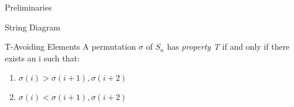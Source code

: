 \documentclass[11pt]{amsart}
\theoremstyle{definition}
\numberwithin{equation}{section}
\renewcommand{\(}{\left(}
\renewcommand{\)}{\right)}
\begin{document}
\begin{section}{Preliminaries}
\begin{subsection}{String Diagram}
\end{subsection}

\begin{subsection}{T-Avoiding Elements}
A permutation $\sigma$ of $S_n$ has \emph{property T} if and only if there exists an i such that:
\begin{enumerate}
\item $\sigma(i)>\sigma(i+1), \sigma(i+2)$\\
\item $\sigma(i)<\sigma(i+1), \sigma(i+2)$
\end{enumerate}

\color{red}{Insert pictures of T-avoiding string diagrams}
\end{subsection}

\end{section}











\end{document}

